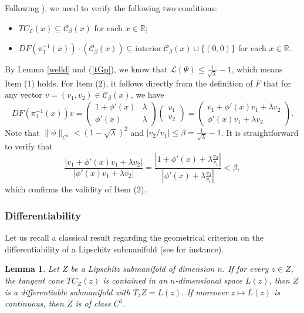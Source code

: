 \documentclass{amsart}
\newcommand{\R}{\mathbb{R}}
\newtheorem{Lemma}[Definition]{Lemma}
\theoremstyle{definition}
\begin{document}
Following \cite[Proof of Theorem 3.1]{BB}), we need to verify the following two conditions:
\begin{itemize}
\item [(1)] $TC_\Gamma(x)\subseteq \mathcal{C}_\beta(x)$ for each $x\in \R$;
\item [(2)] $DF(\pi_1^{-1}(x))\cdot(\mathcal{C}_\beta(x))\subseteq \mathrm{interior}\ \mathcal{C}_\beta(x)\cup \{(0,0)\}$  for each $x\in \R$.
\end{itemize}
By Lemma \ref{welld} and (\ref{tGp}), we know that $\mathcal{L}(\Psi)\leq \frac{1}{\sqrt{\lambda}}-1$, which means Item (1) holds.
For Item (2), it follows directly from the definition of $F$ that for any vector $v = (v_1, v_2) \in \mathcal{C}_\beta(x)$, we have
\[
DF(\pi_1^{-1}(x))v =
\begin{pmatrix}
1+\phi'(x) & \lambda \\
\phi'(x) & \lambda
\end{pmatrix}
\begin{pmatrix}
v_1 \\
v_2
\end{pmatrix}
=
\begin{pmatrix}
v_1 + \phi'(x)v_1 + \lambda v_2 \\
\phi'(x)v_1 + \lambda v_2
\end{pmatrix}.
\]
Note that $\|\phi\|_{C^1} < (1 - \sqrt{\lambda})^2$ and $|v_2 / v_1| \leq \beta = \frac{1}{\sqrt{\lambda}} - 1$. It is straightforward to verify that
\begin{equation}\label{test2}
\frac{|v_1 + \phi'(x)v_1 + \lambda v_2|}{|\phi'(x)v_1 + \lambda v_2|}
= \frac{|1 + \phi'(x) + \lambda \frac{v_2}{v_1}|}{|\phi'(x) + \lambda \frac{v_2}{v_1}|}
< \beta,
\end{equation}
which confirms the validity of Item (2).


\subsubsection{Differentiability}
Let us recall a classical result regarding the geometrical criterion on the differentiability of a Lipschitz submanifold (see \cite[Lemma 4.2]{BB} for instance).
\begin{Lemma}\label{difli}
Let \( Z \) be a Lipschitz submanifold of dimension \( n \). If for every \( z \in Z \), the tangent cone \( TC_Z(z) \) is contained in an \( n \)-dimensional space \( L(z) \), then \( Z \) is a differentiable submanifold with \( T_zZ = L(z) \). If moreover \( z \mapsto L(z) \) is continuous, then \( Z \) is of class \( C^1 \).
\end{Lemma}
\end{document}
